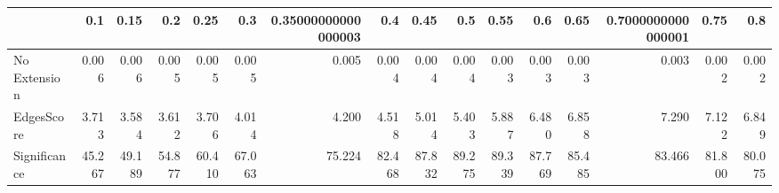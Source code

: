 \begin{tabular}{lrrrrrrrrrrrrrrr}
\toprule
{} &    0.1 &   0.15 &    0.2 &   0.25 &    0.3 & 0.35000000000000003 &    0.4 &   0.45 &    0.5 &   0.55 &    0.6 &   0.65 & 0.7000000000000001 &   0.75 &    0.8 \\
\midrule
No Extension &  0.006 &  0.006 &  0.005 &  0.005 &  0.005 &               0.005 &  0.004 &  0.004 &  0.004 &  0.003 &  0.003 &  0.003 &              0.003 &  0.002 &  0.002 \\
EdgesScore   &  3.713 &  3.584 &  3.612 &  3.706 &  4.014 &               4.200 &  4.518 &  5.014 &  5.403 &  5.887 &  6.480 &  6.858 &              7.290 &  7.122 &  6.849 \\
Significance & 45.267 & 49.189 & 54.877 & 60.410 & 67.063 &              75.224 & 82.468 & 87.832 & 89.275 & 89.339 & 87.769 & 85.485 &             83.466 & 81.800 & 80.075 \\
\bottomrule
\end{tabular}
